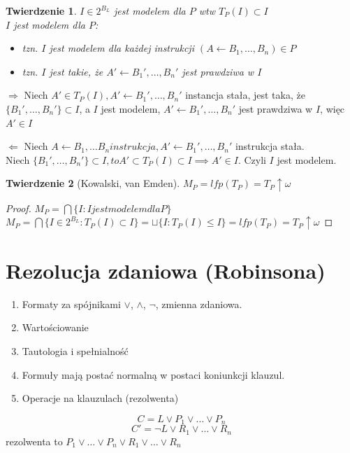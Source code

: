 \documentclass[10pt,a4paper]{article}
\theoremstyle{plain}
\newtheorem{theorem}{Twierdzenie}
\theoremstyle{definition}
\begin{document}
\begin{theorem}
$I\in 2^{B_L}$ jest modelem dla $P$ wtw $T_P(I) \subset I$\\
\textit{$I$ jest modelem dla $P$:}
\begin{itemize}
\item \textit{tzn. $I$ jest modelem dla każdej instrukcji $(A\leftarrow B_1, \ldots, B_n) \in P$}
\item \textit{tzn. $I$ jest takie, że $A' \leftarrow B_1', \ldots, B_n'$ jest prawdziwa w $I$ }
\end{itemize}
\end{theorem}

$\Rightarrow$ Niech $A' \in T_P(I), A' \leftarrow B_1', \ldots, B_n'$ instancja stała, jest taka, że $\{B_1', \ldots, B_n'\} \subset I$, a $I$ jest modelem, $A' \leftarrow B_1', \ldots, B_n'$  jest prawdziwa w $I$, więc $A' \in I$

$\Leftarrow$ Niech $A \leftarrow B_1, \ldots B_n instrukcja, A' \leftarrow B_1', \ldots, B_n'$ instrukcja stała.\\
Niech $\{B_1', \ldots, B_n' \} \subset I, to {A'} \subset T_P(I) \subset I \implies A'\in I$. Czyli $I$ jest modelem.

\begin{theorem}[Kowalski, van Emden]
$M_P = lfp(T_P) = T_P\uparrow\omega$
\end{theorem}

\begin{proof}
$M_P = \bigcap \{ I : I jest modelem dla P \}$\\
$M_P = \bigcap \{ I \in 2^{B_L} : T_P(I) \subset I\} = \sqcup \{ I : T_P(I) \leq I\} = lfp(T_P) = T_P\uparrow\omega$
\end{proof}

\section{Rezolucja zdaniowa (Robinsona)}
\begin{enumerate}
\item Formaty za spójnikami $\vee$, $\wedge$, $\neg$, zmienna zdaniowa.
\item Wartościowanie
\item Tautologia i spełnialność
\item Formuły mają postać normalną w postaci koniunkcji klauzul.
\item Operacje na klauzulach (rezolwenta)
\end{enumerate}
$$C = L \vee P_1\vee \ldots \vee P_n$$
$$C' = \neg L \vee R_1\vee \ldots \vee R_n$$
rezolwenta to $P_1\vee \ldots \vee P_n \vee R_1\vee \ldots \vee R_n$
\end{document}
